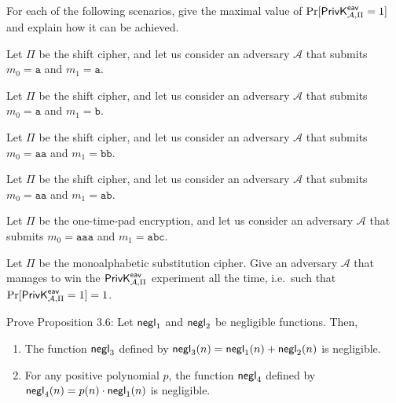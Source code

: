 \documentclass[a4paper,10pt,landscape,twocolumn]{scrartcl}
\begin{document}
\begin{exercise}
For each of the following scenarios, give the maximal value of $\Pr[\mathsf{PrivK}^{\mathsf{eav}}_{\mathcal{A},\Pi}=1]$ and explain how it can be achieved.

\begin{subex}
Let $\Pi$ be the shift cipher, and let us consider an adversary $\mathcal{A}$ that submits $m_0 = \mathtt{a}$ and $m_1 = \mathtt{a}$. 
\end{subex}

\begin{subex}
Let $\Pi$ be the shift cipher, and let us consider an adversary $\mathcal{A}$ that submits $m_0 = \mathtt{a}$ and $m_1 = \mathtt{b}$. 
\end{subex}

\begin{subex}
Let $\Pi$ be the shift cipher, and let us consider an adversary $\mathcal{A}$ that submits $m_0 = \mathtt{aa}$ and $m_1 = \mathtt{bb}$. 
\end{subex}

\begin{subex}
Let $\Pi$ be the shift cipher, and let us consider an adversary $\mathcal{A}$ that submits $m_0 = \mathtt{aa}$ and $m_1 = \mathtt{ab}$. 
\end{subex}

\begin{subex}
Let $\Pi$ be the one-time-pad encryption, and let us consider an adversary $\mathcal{A}$ that submits $m_0 = \mathtt{aaa}$ and $m_1 = \mathtt{abc}$. 
\end{subex}

\begin{subex}
Let $\Pi$ be the monoalphabetic substitution cipher. Give an adversary $\mathcal{A}$ that manages to win the $\mathsf{PrivK}^{\mathsf{eav}}_{\mathcal{A},\Pi}$ experiment all the time, i.e.\ such that $\Pr[\mathsf{PrivK}^{\mathsf{eav}}_{\mathcal{A},\Pi}=1] = 1$.
\end{subex}
\end{exercise}


\begin{exercise}
Prove Proposition 3.6:
Let $\mathsf{negl}_1$ and $\mathsf{negl}_2$ be negligible functions. Then,
\begin{enumerate}
\item The function $\mathsf{negl}_3$ defined by $\mathsf{negl}_3(n) = \mathsf{negl}_1(n)+\mathsf{negl}_2(n)$ is
  negligible.
\item For any positive polynomial $p$, the function $\mathsf{negl}_4$ defined
  by $\mathsf{negl}_4(n) = p(n) \cdot \mathsf{negl}_1(n)$ is negligible.
\end{enumerate}
\end{exercise}
\end{document}
